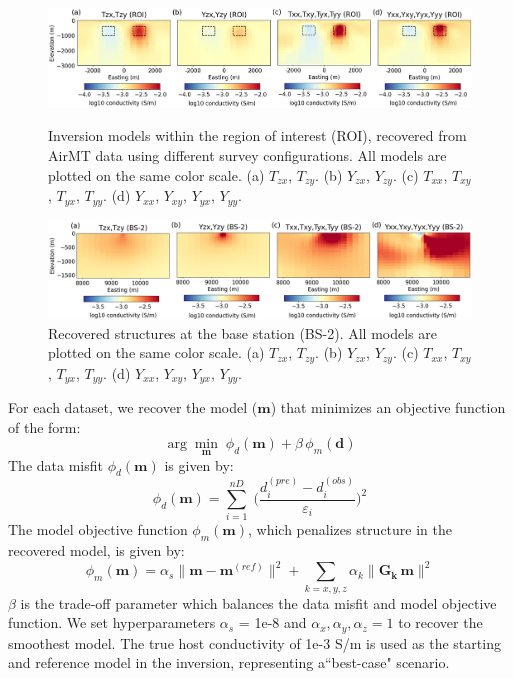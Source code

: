 \documentclass{segabs}
\begin{document}
\begin{figure}[t!]
\includegraphics[width=2\columnwidth]{images/inversion.png}
\vspace{-8pt}
\caption{Inversion models within the region of interest (ROI), recovered from AirMT data using different survey configurations. All models are plotted on the same color scale. (a) $T_{zx}$, $T_{zy}$. (b) $Y_{zx}$, $Y_{zy}$. (c) $T_{xx}$, $T_{xy}$, $T_{yx}$, $T_{yy}$. (d) $Y_{xx}$, $Y_{xy}$, $Y_{yx}$, $Y_{yy}$.}
\label{fig:inversion}
\vspace{5pt}
\includegraphics[width=2\columnwidth]{images/inversion_base.png}
\vspace{-6pt}
\caption{Recovered structures at the base station (BS-2). All models are plotted on the same color scale. (a) $T_{zx}$, $T_{zy}$. (b) $Y_{zx}$, $Y_{zy}$. (c) $T_{xx}$, $T_{xy}$, $T_{yx}$, $T_{yy}$. (d) $Y_{xx}$, $Y_{xy}$, $Y_{yx}$, $Y_{yy}$.}
\label{fig:inversion_base}
\vspace{-15pt}
\end{figure}
For each dataset, we recover the model ($\mathbf{m}$) that minimizes an objective function of the form:
\begin{equation}
\arg \min_\mathbf{m} \; \phi_d (\mathbf{m}) + \beta \, \phi_m (\mathbf{d})
\end{equation}
The data misfit $\phi_d (\mathbf{m})$ is given by:
\begin{equation}
\phi_d (\mathbf{m}) = \sum_{i=1}^{nD} \; \Bigg ( \frac{d_i^{(pre)} - d_i^{(obs)} }{\varepsilon_i} \Bigg )^2
\end{equation}
The model objective function $\phi_m (\mathbf{m})$, which penalizes structure in the recovered model, is given by:
\begin{equation}
\phi_m (\mathbf{m}) = \alpha_s \big \| \mathbf{m - m}^{(ref)} \big \|^2 + \sum_{k=x,y,z} \alpha_k \big \| \mathbf{G_k \, m} \big \|^2
\end{equation}
$\beta$ is the trade-off parameter which balances the data misfit and model objective function. We set hyperparameters $\alpha_s$ = 1e-8 and $\alpha_x,\alpha_y, \alpha_z=1$ to recover the smoothest model. The true host conductivity of 1e-3 S/m is used as the starting and reference model in the inversion, representing a``best-case" scenario.
\end{document}
